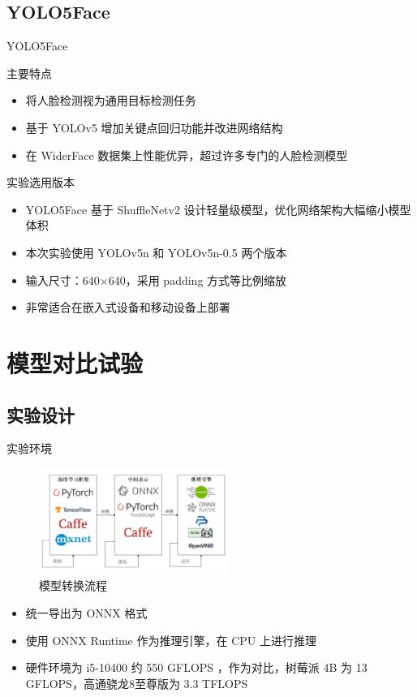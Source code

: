 \documentclass{beamer}
\begin{document}
\subsection{YOLO5Face}
\begin{frame}{YOLO5Face}
    \begin{block}{主要特点}
        \begin{itemize}
            \item 将人脸检测视为通用目标检测任务
            \item 基于 YOLOv5 增加关键点回归功能并改进网络结构
            \item 在 WiderFace 数据集上性能优异，超过许多专门的人脸检测模型
        \end{itemize}
    \end{block}
    
    \begin{block}{实验选用版本}
        \begin{itemize}
            \item YOLO5Face 基于 ShuffleNetv2 设计轻量级模型，优化网络架构大幅缩小模型体积
            \item 本次实验使用 YOLOv5n 和 YOLOv5n-0.5 两个版本
            \item 输入尺寸：640$\times$640，采用 padding 方式等比例缩放
            \item 非常适合在嵌入式设备和移动设备上部署
        \end{itemize}
    \end{block}
\end{frame}

\section{模型对比试验}

\subsection{实验设计}
\begin{frame}{实验环境}

    \begin{figure}[h]
        \centering
        \includegraphics[width=0.55\textwidth]{pic/pipeline.jpg}
        \caption{模型转换流程}
    \end{figure}
    \begin{itemize}
        \item 统一导出为 ONNX 格式
        \item 使用 ONNX Runtime 作为推理引擎，在 CPU 上进行推理
        \item 硬件环境为 i5-10400 约 550 GFLOPS ，作为对比，树莓派 4B 为 13 GFLOPS，高通骁龙8至尊版为 3.3 TFLOPS
    \end{itemize}
\end{frame}
\end{document}
